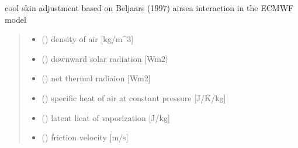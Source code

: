 \documentclass[letterpaper,10pt,english]{sphinxmanual}
\begin{document}
\begin{fulllineitems}
\label{\detokenize{users_guide:AirSeaFluxCode.cs_wl_subs.cs_Beljaars}}
\pysigstartsignatures
{}
\pysigstopsignatures
\sphinxAtStartPar
cool skin adjustment based on Beljaars (1997)
air\sphinxhyphen{}sea interaction in the ECMWF model
\begin{quote}\begin{description}
\begin{itemize}
\item {} 
\sphinxAtStartPar
{} () \textendash{} density of air           {[}kg/m\textasciicircum{}3{]}

\item {} 
\sphinxAtStartPar
{} () \textendash{} downward solar radiation {[}Wm\sphinxhyphen{}2{]}

\item {} 
\sphinxAtStartPar
{} () \textendash{} net thermal radiaion     {[}Wm\sphinxhyphen{}2{]}

\item {} 
\sphinxAtStartPar
{} () \textendash{} specific heat of air at constant pressure {[}J/K/kg{]}

\item {} 
\sphinxAtStartPar
{} () \textendash{} latent heat of vaporization   {[}J/kg{]}

\item {} 
\sphinxAtStartPar
{} () \textendash{} friction velocity         {[}m/s{]}


\end{itemize}
\end{description}
\end{quote}
\end{fulllineitems}
\end{document}
